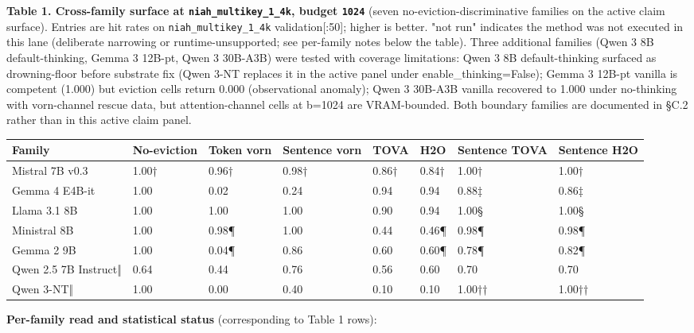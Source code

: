 \documentclass[
]{article}
\newcounter{none} %
\begin{document}
\textbf{Table 1. Cross-family surface at \texttt{niah\_multikey\_1\_4k},
budget \texttt{1024}} (seven no-eviction-discriminative families on the
active claim surface). Entries are hit rates on
\texttt{niah\_multikey\_1\_4k} validation{[}:50{]}; higher is better.
"not run" indicates the method was not executed in this lane (deliberate
narrowing or runtime-unsupported; see per-family notes below the table).
Three additional families (Qwen 3 8B default-thinking, Gemma 3 12B-pt,
Qwen 3 30B-A3B) were tested with coverage limitations: Qwen 3 8B
default-thinking surfaced as drowning-floor before substrate fix
(Qwen 3-NT replaces it in the active panel under
enable\_thinking=False); Gemma 3 12B-pt vanilla is competent (1.000)
but eviction cells return 0.000 (observational anomaly); Qwen 3 30B-A3B
vanilla recovered to 1.000 under no-thinking with vorn-channel rescue
data, but attention-channel cells at b=1024 are VRAM-bounded. Both
boundary families are documented in §C.2 rather than in this active
claim panel.

{\def\LTcaptype{none} %
{\scriptsize\setlength{\tabcolsep}{2pt}\renewcommand{\arraystretch}{0.92} \begin{longtable}[]{@{}llllllll@{}}
\toprule\noalign{}
Family & No-eviction & Token vorn & Sentence vorn & TOVA &
H2O & Sentence TOVA & Sentence H2O \\
\midrule\noalign{}
\endhead
\bottomrule\noalign{}
\endlastfoot
Mistral 7B v0.3 & 1.00† & 0.96† & 0.98† & 0.86† & 0.84† & 1.00† &
1.00† \\
Gemma 4 E4B-it & 1.00 & 0.02 & 0.24 & 0.94 & 0.94 & 0.88‡ & 0.86‡ \\
Llama 3.1 8B & 1.00 & 1.00 & 1.00 & 0.90 & 0.94 & 1.00§ & 1.00§ \\
Ministral 8B & 1.00 & 0.98¶ & 1.00 & 0.44 & 0.46¶ & 0.98¶ & 0.98¶ \\
Gemma 2 9B & 1.00 & 0.04¶ & 0.86 & 0.60 & 0.60¶ & 0.78¶ & 0.82¶ \\
Qwen 2.5 7B Instruct‖ & 0.64 & 0.44 & 0.76 & 0.56 & 0.60 & 0.70 & 0.70 \\
Qwen 3-NT‖ & 1.00 & 0.00 & 0.40 & 0.10 & 0.10 & 1.00†† & 1.00†† \\
\end{longtable}}
}

\textbf{Per-family read and statistical status} (corresponding to Table
1 rows):
\end{document}
